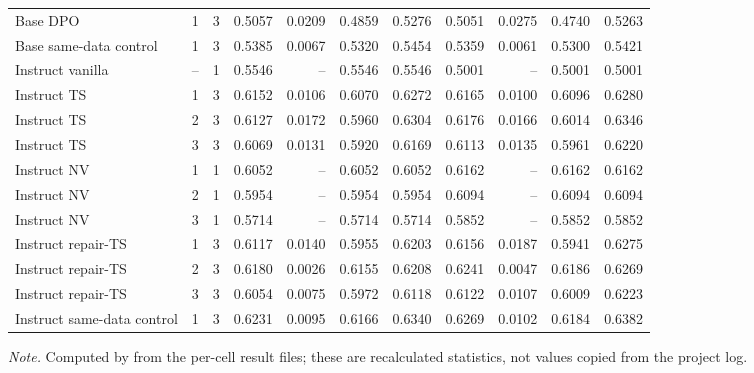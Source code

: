 {\begin{longtable}{@{}lccrrrrrrrr@{}}
Base DPO & 1 & 3 & 0.5057 & 0.0209 & 0.4859 & 0.5276 & 0.5051 & 0.0275 & 0.4740 & 0.5263\\
Base same-data control & 1 & 3 & 0.5385 & 0.0067 & 0.5320 & 0.5454 & 0.5359 & 0.0061 & 0.5300 & 0.5421\\
Instruct vanilla & -- & 1 & 0.5546 & -- & 0.5546 & 0.5546 & 0.5001 & -- & 0.5001 & 0.5001\\
Instruct TS & 1 & 3 & 0.6152 & 0.0106 & 0.6070 & 0.6272 & 0.6165 & 0.0100 & 0.6096 & 0.6280\\
Instruct TS & 2 & 3 & 0.6127 & 0.0172 & 0.5960 & 0.6304 & 0.6176 & 0.0166 & 0.6014 & 0.6346\\
Instruct TS & 3 & 3 & 0.6069 & 0.0131 & 0.5920 & 0.6169 & 0.6113 & 0.0135 & 0.5961 & 0.6220\\
Instruct NV & 1 & 1 & 0.6052 & -- & 0.6052 & 0.6052 & 0.6162 & -- & 0.6162 & 0.6162\\
Instruct NV & 2 & 1 & 0.5954 & -- & 0.5954 & 0.5954 & 0.6094 & -- & 0.6094 & 0.6094\\
Instruct NV & 3 & 1 & 0.5714 & -- & 0.5714 & 0.5714 & 0.5852 & -- & 0.5852 & 0.5852\\
Instruct repair-TS & 1 & 3 & 0.6117 & 0.0140 & 0.5955 & 0.6203 & 0.6156 & 0.0187 & 0.5941 & 0.6275\\
Instruct repair-TS & 2 & 3 & 0.6180 & 0.0026 & 0.6155 & 0.6208 & 0.6241 & 0.0047 & 0.6186 & 0.6269\\
Instruct repair-TS & 3 & 3 & 0.6054 & 0.0075 & 0.5972 & 0.6118 & 0.6122 & 0.0107 & 0.6009 & 0.6223\\
Instruct same-data control & 1 & 3 & 0.6231 & 0.0095 & 0.6166 & 0.6340 & 0.6269 & 0.0102 & 0.6184 & 0.6382\\
\end{longtable}
}
\vspace{-0.6\baselineskip}
{\footnotesize\color{slate}\textit{Note.} Computed by  from the per-cell result files; these are recalculated statistics, not values copied from the project log.\par}
\medskip
